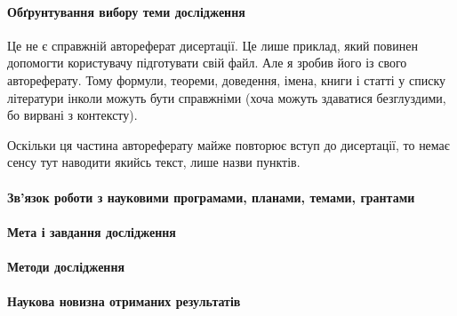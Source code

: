 \documentclass[
]{mon2017dev-aref}[2019/11/16]
\theoremstyle{plain}
\theoremstyle{definition}
\theoremstyle{remark}
\begin{document}
\paragraph{Обґрунтування вибору теми дослідження}

Це не є справжній автореферат дисертації. Це лише приклад, який
повинен допомогти користувачу підготувати свій файл. Але я зробив
його із свого автореферату. Тому формули, теореми, доведення,
імена, книги і статті у списку літератури інколи можуть бути
справжніми (хоча можуть здаватися безглуздими, бо вирвані з
контексту).

Оскільки ця частина автореферату майже повторює вступ до
дисертації, то немає сенсу тут наводити якийсь текст, лише назви
пунктів.

\paragraph{Зв'язок роботи з науковими програмами, планами, темами, грантами}

\paragraph{Мета і завдання дослідження}

\paragraph{Методи дослідження}

\paragraph{Наукова новизна отриманих результатів}

\end{document}

